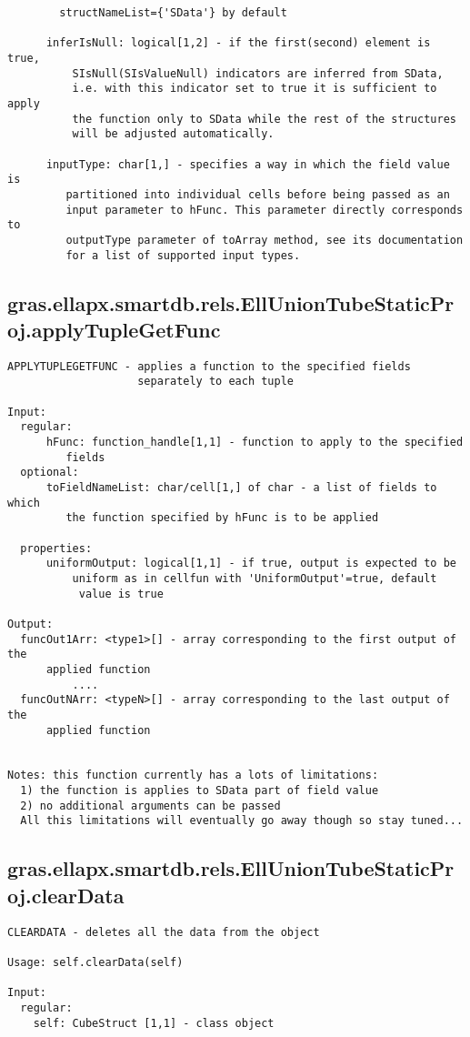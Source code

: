 \begin{verbatim}
        structNameList={'SData'} by default

      inferIsNull: logical[1,2] - if the first(second) element is true,
          SIsNull(SIsValueNull) indicators are inferred from SData,
          i.e. with this indicator set to true it is sufficient to apply
          the function only to SData while the rest of the structures
          will be adjusted automatically.

      inputType: char[1,] - specifies a way in which the field value is
         partitioned into individual cells before being passed as an
         input parameter to hFunc. This parameter directly corresponds to
         outputType parameter of toArray method, see its documentation
         for a list of supported input types.
\end{verbatim}
\subsection{\texorpdfstring{gras.ellapx.smartdb.rels.EllUnionTubeStaticProj.applyTupleGetFunc}{applyTupleGetFunc}}\label{method:gras.ellapx.smartdb.rels.EllUnionTubeStaticProj.applyTupleGetFunc}
\begin{verbatim}
APPLYTUPLEGETFUNC - applies a function to the specified fields
                    separately to each tuple

Input:
  regular:
      hFunc: function_handle[1,1] - function to apply to the specified
         fields
  optional:
      toFieldNameList: char/cell[1,] of char - a list of fields to which
         the function specified by hFunc is to be applied

  properties:
      uniformOutput: logical[1,1] - if true, output is expected to be
          uniform as in cellfun with 'UniformOutput'=true, default
           value is true

Output:
  funcOut1Arr: <type1>[] - array corresponding to the first output of the
      applied function
          ....
  funcOutNArr: <typeN>[] - array corresponding to the last output of the
      applied function


Notes: this function currently has a lots of limitations:
  1) the function is applies to SData part of field value
  2) no additional arguments can be passed
  All this limitations will eventually go away though so stay tuned...
\end{verbatim}
\subsection{\texorpdfstring{gras.ellapx.smartdb.rels.EllUnionTubeStaticProj.clearData}{clearData}}\label{method:gras.ellapx.smartdb.rels.EllUnionTubeStaticProj.clearData}
\begin{verbatim}
CLEARDATA - deletes all the data from the object

Usage: self.clearData(self)

Input:
  regular:
    self: CubeStruct [1,1] - class object
\end{verbatim}
